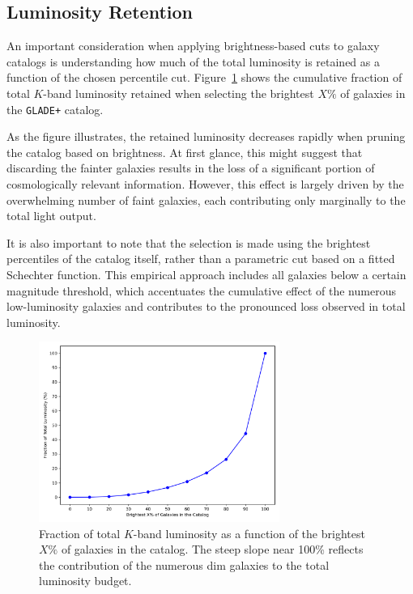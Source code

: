 \subsection{Luminosity Retention}
An important consideration when applying brightness-based cuts to galaxy catalogs is understanding how much of the total luminosity is retained as a function of the chosen percentile cut. Figure~\ref{fig:luminosity_fraction} shows the cumulative fraction of total $K$-band luminosity retained when selecting the brightest $X\%$ of galaxies in the \texttt{GLADE+} catalog.

As the figure illustrates, the retained luminosity decreases rapidly when pruning the catalog based on brightness. At first glance, this might suggest that discarding the fainter galaxies results in the loss of a significant portion of cosmologically relevant information. However, this effect is largely driven by the overwhelming number of faint galaxies, each contributing only marginally to the total light output. 

It is also important to note that the selection is made using the brightest percentiles of the catalog itself, rather than a parametric cut based on a fitted Schechter function. This empirical approach includes all galaxies below a certain magnitude threshold, which accentuates the cumulative effect of the numerous low-luminosity galaxies and contributes to the pronounced loss observed in total luminosity.

\begin{figure}[h]
    \centering
    \includegraphics[width=0.7\textwidth]{figures/luminosity_fraction_vs_percentile_GLADE.png}
    \caption[\texttt{GLADE+} luminosity retention.]{Fraction of total $K$-band luminosity as a function of the brightest $X\%$ of galaxies in the catalog. The steep slope near 100\% reflects the contribution of the numerous dim galaxies to the total luminosity budget.\footnotemark}
    \label{fig:luminosity_fraction}
\end{figure}

